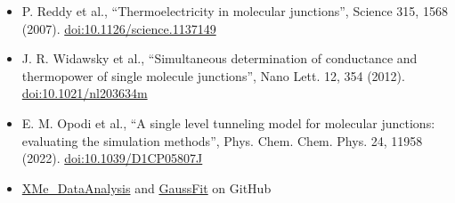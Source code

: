 \documentclass[
  11pt,
  a4paper,
]{article}
\begin{document}
\begin{itemize}
  effective electrical contact area for EGaIn-based molecular tunneling
  junctions'', J. Am. Chem. Soc. 135, 18131 (2013).
  \href{https://doi.org/10.1021/ja408652h}{doi:10.1021/ja408652h}
\item
  P. Reddy et al., ``Thermoelectricity in molecular junctions'', Science
  315, 1568 (2007).
  \href{https://doi.org/10.1126/science.1137149}{doi:10.1126/science.1137149}
\item
  J. R. Widawsky et al., ``Simultaneous determination of conductance and
  thermopower of single molecule junctions'', Nano Lett. 12, 354 (2012).
  \href{https://doi.org/10.1021/nl203634m}{doi:10.1021/nl203634m}
\item
  E. M. Opodi et al., ``A single level tunneling model for molecular
  junctions: evaluating the simulation methods'', Phys. Chem. Chem.
  Phys. 24, 11958 (2022).
  \href{https://doi.org/10.1039/D1CP05807J}{doi:10.1039/D1CP05807J}
\item
  \href{https://github.com/Pilab-XMU/XMe_DataAnalysis}{XMe\_DataAnalysis}
  and \href{https://github.com/rchiechi/gaussfit}{GaussFit} on GitHub
\end{itemize}
\end{document}
